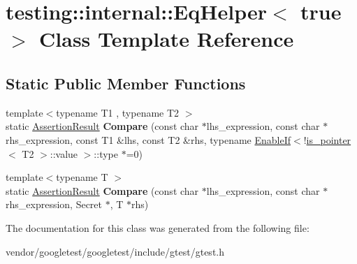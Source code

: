 \hypertarget{classtesting_1_1internal_1_1EqHelper_3_01true_01_4}{}\section{testing\+:\+:internal\+:\+:Eq\+Helper$<$ true $>$ Class Template Reference}
\label{classtesting_1_1internal_1_1EqHelper_3_01true_01_4}
\subsection*{Static Public Member Functions}
\begin{DoxyCompactItemize}
\item 
{\footnotesize template$<$typename T1 , typename T2 $>$ }\\static \hyperlink{classtesting_1_1AssertionResult}{Assertion\+Result} {\bfseries Compare} (const char $\ast$lhs\+\_\+expression, const char $\ast$rhs\+\_\+expression, const T1 \&lhs, const T2 \&rhs, typename \hyperlink{structtesting_1_1internal_1_1EnableIf}{Enable\+If}$<$!\hyperlink{structtesting_1_1internal_1_1is__pointer}{is\+\_\+pointer}$<$ T2 $>$\+::value $>$\+::type $\ast$=0)\hypertarget{classtesting_1_1internal_1_1EqHelper_3_01true_01_4_a12c7194b2a210b61f06c912eef484ca6}{}\label{classtesting_1_1internal_1_1EqHelper_3_01true_01_4_a12c7194b2a210b61f06c912eef484ca6}

\item 
{\footnotesize template$<$typename T $>$ }\\static \hyperlink{classtesting_1_1AssertionResult}{Assertion\+Result} {\bfseries Compare} (const char $\ast$lhs\+\_\+expression, const char $\ast$rhs\+\_\+expression, Secret $\ast$, T $\ast$rhs)\hypertarget{classtesting_1_1internal_1_1EqHelper_3_01true_01_4_a6f292601a68c8f0d49e6d48bd309b900}{}\label{classtesting_1_1internal_1_1EqHelper_3_01true_01_4_a6f292601a68c8f0d49e6d48bd309b900}

\end{DoxyCompactItemize}


The documentation for this class was generated from the following file\+:\begin{DoxyCompactItemize}
\item 
vendor/googletest/googletest/include/gtest/gtest.\+h\end{DoxyCompactItemize}
